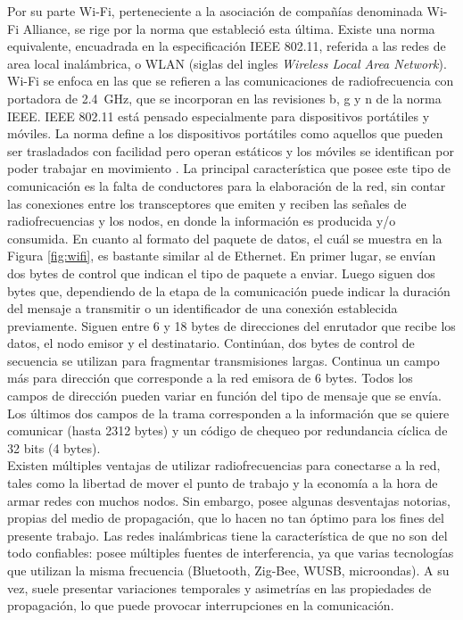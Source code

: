 Por su parte Wi-Fi, perteneciente a la asociación de compañías denominada Wi-Fi Alliance, se rige por la norma que estableció esta última. Existe una norma equivalente, encuadrada en la especificación IEEE 802.11, referida a las redes de area local inalámbrica, o WLAN (siglas del ingles {\it Wireless Local Area Network}). Wi-Fi se enfoca en las que se refieren a las comunicaciones de radiofrecuencia con portadora de \SI{2,4}{\giga\hertz}, que se incorporan en las revisiones b, g y n de la norma IEEE. IEEE 802.11 está pensado especialmente para dispositivos portátiles y móviles. La norma define a los dispositivos portátiles como aquellos que pueden ser trasladados con facilidad pero operan estáticos y los móviles se identifican por poder trabajar en movimiento \cite{wifi2016}. La principal característica que posee este tipo de comunicación es la falta de conductores para la elaboración de la red, sin contar las conexiones entre los transceptores que emiten y reciben las señales de radiofrecuencias y los nodos, en donde la información es producida y/o consumida. En cuanto al formato del paquete de datos, el cuál se muestra en la Figura \ref{fig:wifi}, es bastante similar al de Ethernet. En primer lugar, se envían dos bytes de control que indican el tipo de paquete a enviar. Luego siguen dos bytes que, dependiendo de la etapa de la comunicación puede indicar la duración del mensaje a transmitir o un identificador de una conexión establecida previamente. Siguen entre 6 y 18 bytes de direcciones del enrutador que recibe los datos, el nodo emisor y el destinatario. Continúan, dos bytes de control de secuencia se utilizan para fragmentar transmisiones largas. Continua un campo más para dirección que corresponde a la red emisora de 6 bytes. Todos los campos de dirección pueden variar en función del tipo de mensaje que se envía. Los últimos dos campos de la trama corresponden a la información que se quiere comunicar (hasta 2312 bytes) y un código de chequeo por redundancia cíclica de 32 bits (4 bytes).\\

Existen múltiples ventajas de utilizar radiofrecuencias para conectarse a la red, tales como la libertad de mover el punto de trabajo y la economía a la hora de armar redes con muchos nodos. Sin embargo, posee algunas desventajas notorias, propias del medio de propagación, que lo hacen no tan óptimo para los fines del presente trabajo. Las redes inalámbricas tiene la característica de que no son del todo confiables: posee múltiples fuentes de interferencia, ya que varias tecnologías que utilizan la misma frecuencia (Bluetooth, Zig-Bee, WUSB, microondas). A su vez, suele presentar variaciones temporales y asimetrías en las propiedades de propagación, lo que puede provocar interrupciones en la comunicación.\\

